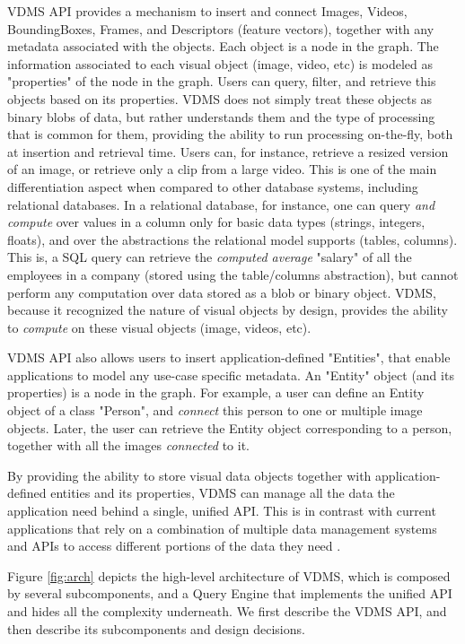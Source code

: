 VDMS API provides a mechanism to insert and connect Images, Videos, BoundingBoxes,
Frames, and Descriptors (feature vectors), together with any metadata
associated with the objects.
Each object is a node in the graph.
The information associated to each visual object (image, video, etc) is modeled as
"properties" of the node in the graph.
Users can query, filter, and retrieve this objects based on its properties.
VDMS does not simply treat these objects as binary blobs of data, but rather
understands them and the type of processing that is common for them,
providing the ability to run processing on-the-fly, both at insertion and
retrieval time.
Users can, for instance, retrieve a resized version of an image,
or retrieve only a clip from a large video.
This is one of the main differentiation aspect when compared to other
database systems, including relational databases.
In a relational database, for instance, one can query \textit{and compute}
over values in a column only for basic data types (strings, integers, floats),
and over the abstractions the relational model supports (tables, columns).
This is, a SQL query can retrieve the \textit{computed average} "salary" of all
the employees in a company (stored using the table/columns abstraction),
but cannot perform any computation over data stored as a blob or binary object.
VDMS, because it recognized the nature of visual objects by design,
provides the ability to \textit{compute} on these visual objects
(image, videos, etc).

VDMS API also allows users to insert application-defined "Entities",
that enable applications to model any use-case specific metadata.
An "Entity" object (and its properties) is a node in the graph.
For example, a user can define an Entity object of a class "Person",
and \textit{connect} this person to one or multiple image objects.
Later, the user can retrieve the Entity object corresponding to a person,
together with all the images \textit{connected} to it.

By providing the ability to store visual data objects together with
application-defined entities and its properties, VDMS can manage
all the data the application need behind a single, unified API.
This is in contrast with current applications that rely on a combination
of multiple data management systems and APIs to access different
portions of the data they need
\cite{tao, sculley2015hidden, mayer2020scalable, sculley2015hidden}.

Figure \ref{fig:arch} depicts the high-level architecture of VDMS, which
is composed by several subcomponents, and a Query Engine that implements
the unified API and hides all the complexity underneath.
We first describe the VDMS API, and then describe its subcomponents
and design decisions.

